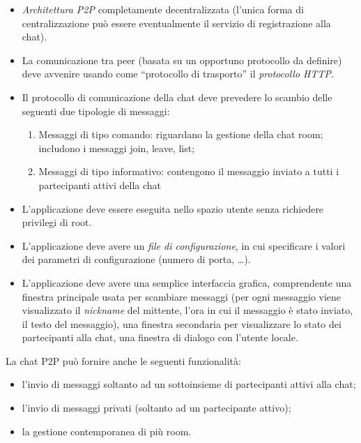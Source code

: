 \begin{itemize}
\item \textit{Architettura P2P} completamente decentralizzata (l’unica forma di centralizzazione può essere eventualmente il servizio di registrazione alla chat).
\item La comunicazione tra peer (basata su un opportuno protocollo da definire) deve avvenire usando come “protocollo di trasporto” il \textit{protocollo HTTP}.
\item Il protocollo di comunicazione della chat deve prevedere lo scambio delle seguenti due tipologie di messaggi:
\begin{enumerate}
\item Messaggi di tipo comando: riguardano la gestione della chat room; includono i messaggi join, leave, list;
\item Messaggi di tipo informativo: contengono il messaggio inviato a tutti i partecipanti attivi della chat
\end{enumerate}
\item L’applicazione deve essere eseguita nello spazio utente senza richiedere privilegi di root.
\item L’applicazione deve avere un \textit{file di configurazione}, in cui specificare i valori dei parametri di configurazione (numero di porta, …).
\item L’applicazione deve avere una semplice interfaccia grafica, comprendente una finestra principale usata per scambiare messaggi (per ogni messaggio viene visualizzato il \textit{nickname} del mittente, l’ora in cui il messaggio è stato inviato, il testo del messaggio), una finestra secondaria per visualizzare lo stato dei partecipanti alla chat, una finestra di dialogo con l’utente locale.
\end{itemize}
La chat P2P può fornire anche le seguenti funzionalità:
\begin{itemize}
\item l’invio di messaggi soltanto ad un sottoinsieme di partecipanti attivi alla chat;
\item l’invio di messaggi privati (soltanto ad un partecipante attivo);
\item la gestione contemporanea di più room.
\end{itemize}
